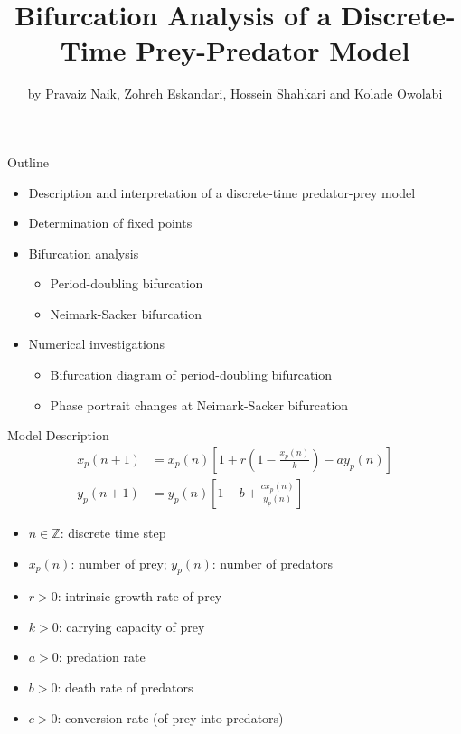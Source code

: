 \documentclass[]{beamer}
\title{Bifurcation Analysis of a Discrete-Time Prey-Predator Model}
\author{by Pravaiz Naik, Zohreh Eskandari, Hossein Shahkari and Kolade Owolabi}
\institute{Presented by Jacob Hauck}
\date{}
\begin{document}
	\frame{\titlepage}
	
	\begin{frame}{Outline}
		\begin{itemize}
			\item Description and interpretation of a discrete-time predator-prey model
			\vfill
			\pause
			
			\item Determination of fixed points
			\vfill
			\pause
			
			\item Bifurcation analysis
			\begin{itemize}
				\item Period-doubling bifurcation
				\item Neimark-Sacker bifurcation
			\end{itemize}
			\vfill
			\pause
			
			\item Numerical investigations
			\begin{itemize}
				\item Bifurcation diagram of period-doubling bifurcation
				\item Phase portrait changes at Neimark-Sacker bifurcation
			\end{itemize}
		\end{itemize}
	\end{frame}
	
	\begin{frame}{Model Description}
		\begin{align*}
			x_p(n+1) &= x_p(n)\left[1 + r\left(1 - \frac{x_p(n)}{k}\right) - ay_p(n)\right] \\[0.3em]
			y_p(n+1) &= y_p(n)\left[1 - b + \frac{cx_p(n)}{y_p(n)}\right]
		\end{align*}
		\begin{itemize}
			\item $n \in \mathbb{Z}$: discrete time step
			\pause
			\item $x_p(n)$: number of prey; $y_p(n)$: number of predators
			\pause
			\item $r > 0$: intrinsic growth rate of prey
			\pause
			\item $k > 0$: carrying capacity of prey
			\pause
			\item $a > 0$: predation rate
			\pause
			\item $b > 0$: death rate of predators
			\pause
			\item $c > 0$: conversion rate (of prey into predators)
		\end{itemize}
	\end{frame}
	
\end{document}

